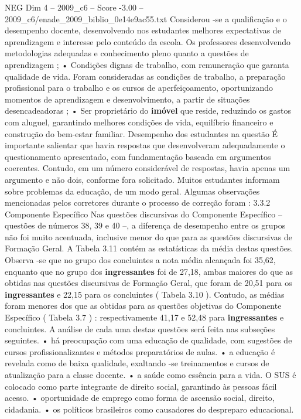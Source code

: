 \begin{textsample}{NEG Dim 4 – 2009\_c6 – Score -3.00 – 2009\_c6/enade\_2009\_biblio\_0e14e9ac55.txt}
Considerou -se a qualificação e o desempenho docente, desenvolvendo nos estudantes melhores expectativas de aprendizagem e interesse pelo conteúdo da escola.
Os professores desenvolvendo metodologias adequadas e conhecimento pleno quanto a questões de aprendizagem ; • Condições dignas de trabalho, com remuneração que garanta qualidade de vida.
Foram consideradas as condições de trabalho, a preparação profissional para o trabalho e os cursos de aperfeiçoamento, oportunizando momentos de aprendizagem e desenvolvimento, a partir de situações desencadeadoras ; • Ser proprietário do \textbf{imóvel} que reside, reduzindo os gastos com aluguel, garantindo melhores condições de vida, equilíbrio financeiro e construção do bem-estar familiar.
Desempenho dos estudantes na questão É importante salientar que havia respostas que desenvolveram adequadamente o questionamento apresentado, com fundamentação baseada em argumentos coerentes.
Contudo, em um número considerável de respostas, havia apenas um argumento e não dois, conforme fora solicitado.
Muitos estudantes informam sobre problemas da educação, de um modo geral.
Algumas observações mencionadas pelos corretores durante o processo de correção foram : 3.3.2 Componente Específico Nas questões discursivas do Componente Específico – questões de números 38, 39 e 40 –, a diferença de desempenho entre os grupos não foi muito acentuada, inclusive menor do que para as questões discursivas de Formação Geral.
A Tabela 3.11 contém as estatísticas da média destas questões.
Observa -se que no grupo dos concluintes a nota média alcançada foi 35,62, enquanto que no grupo dos \textbf{ingressantes} foi de 27,18, ambas maiores do que as obtidas nas questões discursivas de Formação Geral, que foram de 20,51 para os \textbf{ingressantes} e 22,15 para os concluintes ( Tabela 3.10 ).
Contudo, as médias foram menores dos que as obtidas para as questões objetivas do Componente Específico ( Tabela 3.7 ) : respectivamente 41,17 e 52,48 para \textbf{ingressantes} e concluintes.
A análise de cada uma destas questões será feita nas subseções seguintes. • há preocupação com uma educação de qualidade, com sugestões de cursos profissionalizantes e métodos preparatórios de aulas. • a educação é revelada como de baixa qualidade, exaltando -se treinamentos e cursos de atualização para a classe docente. • a saúde como essência para a vida.
O SUS é colocado como parte integrante de direito social, garantindo às pessoas fácil acesso. • oportunidade de emprego como forma de ascensão social, direito, cidadania. • os políticos brasileiros como causadores do despreparo educacional.

\end{textsample}
